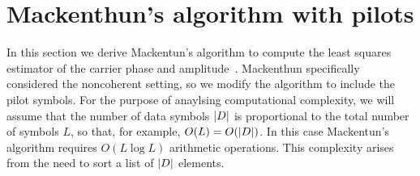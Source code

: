 \documentclass[journal]{IEEEtran}
\begin{document}

\section{Mackenthun's algorithm with pilots}\label{sec:least-squar-estim}

In this section we derive Mackentun's algorithm to compute the least squares estimator of the carrier phase and amplitude~\cite{Mackenthun1994}.  Mackenthun specifically considered the noncoherent setting, so we modify the algorithm to include the pilot symbols.  For the purpose of anaylsing computational complexity, we will assume that the number of data symbols ${\left\vert D \right\vert}$ is proportional to the total number of symbols $L$, so that, for example, $O(L) = O({\left\vert D \right\vert})$.  In this case Mackentun's algorithm requires $O(L \log L)$ arithmetic operations.  This complexity arises from the need to sort a list of ${\left\vert D \right\vert}$ elements.  

\end{document}
